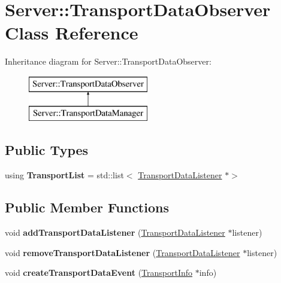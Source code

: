 \hypertarget{classServer_1_1TransportDataObserver}{}\section{Server\+:\+:Transport\+Data\+Observer Class Reference}
\label{classServer_1_1TransportDataObserver}
Inheritance diagram for Server\+:\+:Transport\+Data\+Observer\+:\begin{figure}[H]
\begin{center}
\leavevmode
\includegraphics[height=2.000000cm]{d7/da6/classServer_1_1TransportDataObserver}
\end{center}
\end{figure}
\subsection*{Public Types}
\begin{DoxyCompactItemize}
\item 
\mbox{\label{classServer_1_1TransportDataObserver_a8739537b1241285bff6d76fa7f114e08}} 
using {\bfseries Transport\+List} = std\+::list$<$ \hyperlink{classServer_1_1TransportDataListener}{Transport\+Data\+Listener} $\ast$$>$
\end{DoxyCompactItemize}
\subsection*{Public Member Functions}
\begin{DoxyCompactItemize}
\item 
\mbox{\label{classServer_1_1TransportDataObserver_a49813bf769414fbe1f5100ba1cc16d8c}} 
void {\bfseries add\+Transport\+Data\+Listener} (\hyperlink{classServer_1_1TransportDataListener}{Transport\+Data\+Listener} $\ast$listener)
\item 
\mbox{\label{classServer_1_1TransportDataObserver_a050ac36dc6b757f716a1f6e71d7744bb}} 
void {\bfseries remove\+Transport\+Data\+Listener} (\hyperlink{classServer_1_1TransportDataListener}{Transport\+Data\+Listener} $\ast$listener)
\item 
\mbox{\label{classServer_1_1TransportDataObserver_aba37d87334ae8cf5c56f4c6de4f32519}} 
void {\bfseries create\+Transport\+Data\+Event} (\hyperlink{classAlexaEvent_1_1TransportInfo}{Transport\+Info} $\ast$info)
\end{DoxyCompactItemize}


